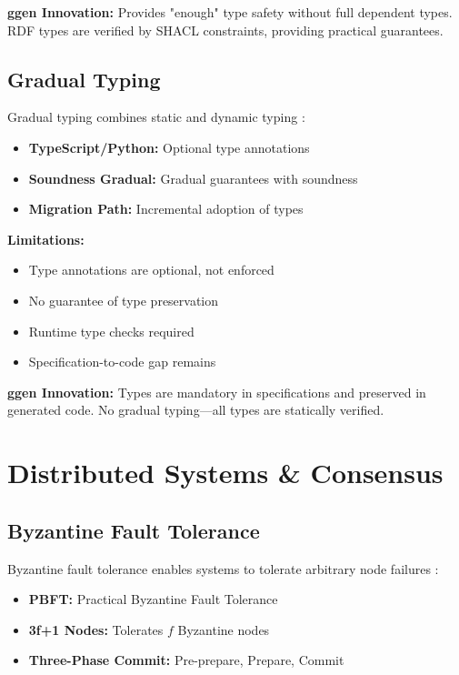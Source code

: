 \textbf{ggen Innovation:} Provides "enough" type safety without full dependent types. RDF types are verified by SHACL constraints, providing practical guarantees.

\subsection{Gradual Typing}

Gradual typing combines static and dynamic typing \cite{siek2006gradual}:

\begin{itemize}
    \item \textbf{TypeScript/Python:} Optional type annotations
    \item \textbf{Soundness Gradual:} Gradual guarantees with soundness
    \item \textbf{Migration Path:} Incremental adoption of types
\end{itemize}

\textbf{Limitations:}
\begin{itemize}
    \item Type annotations are optional, not enforced
    \item No guarantee of type preservation
    \item Runtime type checks required
    \item Specification-to-code gap remains
\end{itemize}

\textbf{ggen Innovation:} Types are mandatory in specifications and preserved in generated code. No gradual typing---all types are statically verified.

\section{Distributed Systems \& Consensus}

\subsection{Byzantine Fault Tolerance}

Byzantine fault tolerance enables systems to tolerate arbitrary node failures \cite{lamport1982byzantine, castro1999practical}:

\begin{itemize}
    \item \textbf{PBFT:} Practical Byzantine Fault Tolerance
    \item \textbf{3f+1 Nodes:} Tolerates \(f\) Byzantine nodes
    \item \textbf{Three-Phase Commit:} Pre-prepare, Prepare, Commit
\end{itemize}

